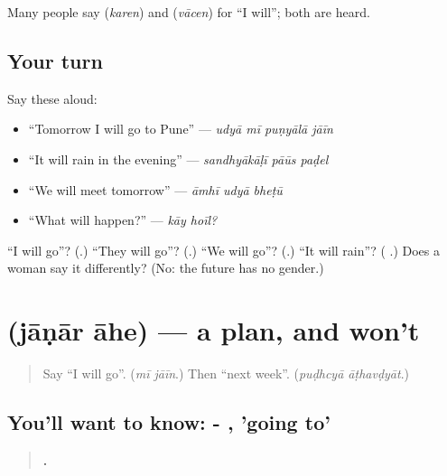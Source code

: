 Many people say \textbf{} (\emph{karen}) and \textbf{} (\emph{vācen}) for \textquotedblleft{}I will\textquotedblright{}; both are heard.

\subsection*{Your turn}
Say these aloud:

\begin{itemize}
\raggedright
  \item \textquotedblleft{}Tomorrow I will go to Pune\textquotedblright{} — \emph{udyā mī puṇyālā jāīn}
  \item \textquotedblleft{}It will rain in the evening\textquotedblright{} — \emph{sandhyākāḷī pāūs paḍel}
  \item \textquotedblleft{}We will meet tomorrow\textquotedblright{} — \emph{āmhī udyā bheṭū}
  \item \textquotedblleft{}What will happen?\textquotedblright{} — \emph{kāy hoīl?}
\end{itemize}

\begin{tcolorbox}[breakable,colback=teal!4,colframe=teal!35!black,title={Before you move on}]
\textquotedblleft{}I will go\textquotedblright{}? (\textbf{}.) \textquotedblleft{}They will go\textquotedblright{}? (\textbf{}.) \textquotedblleft{}We will go\textquotedblright{}? (\textbf{}.) \textquotedblleft{}It will rain\textquotedblright{}? (\textbf{ }.) Does a woman say it differently? (No: the future has no gender.)
\end{tcolorbox}
\section[\texorpdfstring{\mr{जाणार} \mr{आहे} (jāṇār āhe)}{जाणार आहे (jāṇār āhe)}]{  (jāṇār āhe) — a plan, and won't}

\label{lesson:MR-C277-janar-ahe}



\begin{quote}
Say \textquotedblleft{}I will go\textquotedblright{}. (\emph{mī jāīn}.) Then \textquotedblleft{}next week\textquotedblright{}. (\emph{puḍhcyā āṭhavḍyāt}.)
\end{quote}

\subsection*{You'll want to know: - , 'going to'}
\begin{quote}
\textbf{     .}
\end{quote}


